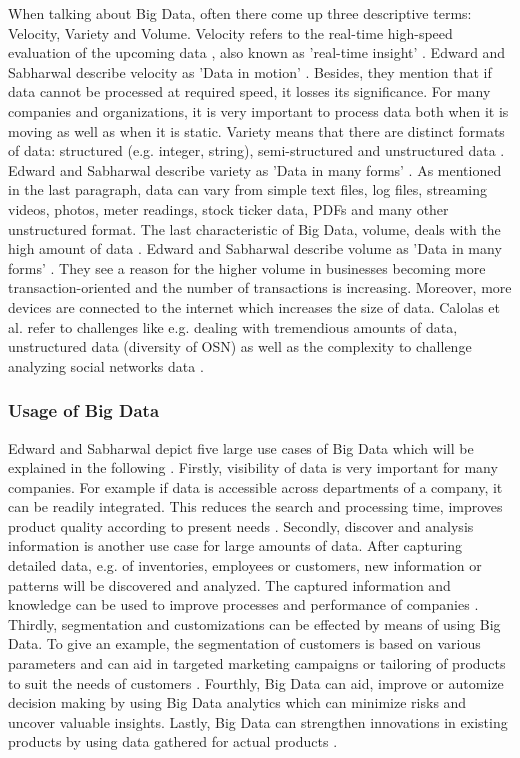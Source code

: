 When talking about Big Data, often there come up three descriptive terms: Velocity, Variety and Volume.
Velocity refers to the real-time high-speed evaluation of the upcoming data \cite{nosql_meier},  also known as 'real-time insight' \cite{mongodb_edward}. Edward and Sabharwal describe velocity as 'Data in motion' \cite[p.7 ff.]{mongodb_edward}. Besides, they mention that if data cannot be processed at required speed, it losses its significance. For many companies and organizations, it is very important to process data both when it is moving as well as when it is static. 
Variety means that there are distinct formats of data: structured (e.g. integer, string), semi-structured and unstructured data \cite{nosql_meier}. Edward and Sabharwal describe variety as 'Data in many forms' \cite[p.7 ff.]{mongodb_edward}. As mentioned in the last paragraph, data can vary from simple text files, log files, streaming videos, photos, meter readings, stock ticker data, PDFs and many other unstructured format.   
The last characteristic of Big Data, volume, deals with the high amount of data \cite{nosql_meier}. Edward and Sabharwal describe volume as 'Data in many forms' \cite[p.7 ff.]{mongodb_edward}. They see a reason for the higher volume in businesses becoming more transaction-oriented and the number of transactions is increasing. Moreover, more devices are connected to the internet which increases the size of data.
Calolas et al. refer to challenges like e.g. dealing with tremendious amounts of data, unstructured data (diversity of \ac{OSN}) as well as the complexity to challenge analyzing social networks data \cites{trends_nosql}.

\subsubsection{Usage of Big Data}

Edward and Sabharwal depict five large use cases of Big Data which will be explained in the following \cite[p.9 ff.]{mongodb_edward}. Firstly, visibility of data is very important for many companies. For example if data is accessible across departments of a company, it can be readily integrated. This reduces the search and processing time, improves product quality according to present needs \cite[p.9 ff.]{mongodb_edward}. Secondly, discover and analysis information is another use case for large amounts of data. After capturing detailed data, e.g. of inventories, employees or customers, new information or patterns will be discovered and analyzed. The captured information and knowledge can be used to improve processes and performance of companies \cite[p.9 ff.]{mongodb_edward}. Thirdly, segmentation and customizations can be effected by means of using Big Data. To give an example, the segmentation of customers is based on various parameters and can aid in targeted marketing campaigns or tailoring of products to suit the needs of customers \cite[p.9 ff.]{mongodb_edward}. Fourthly, Big Data can aid, improve or automize decision making by using Big Data analytics which can minimize risks and uncover valuable insights. Lastly, Big Data can strengthen innovations in existing products by using data gathered for actual products \cite[p.9 ff.]{mongodb_edward}.    

